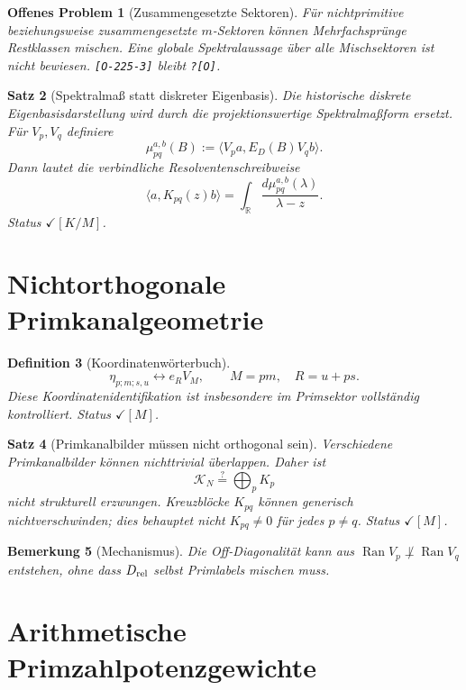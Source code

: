 \documentclass[11pt,a4paper]{amsart}
\newtheorem{theorem}{Satz}[section]
\newtheorem{definition}[theorem]{Definition}
\newtheorem{remark}[theorem]{Bemerkung}
\newtheorem{openproblem}[theorem]{Offenes Problem}
\newcommand{\stM}{\ensuremath{\checkmark[M]}}
\newcommand{\stKM}{\ensuremath{\checkmark[K/M]}}
\newcommand{\Open}{\texttt{?[O]}}
\begin{document}
\begin{openproblem}[Zusammengesetzte Sektoren]
Für nichtprimitive beziehungsweise zusammengesetzte $m$-Sektoren können
Mehrfachsprünge Restklassen mischen. Eine globale Spektralaussage über alle
Mischsektoren ist nicht bewiesen. \texttt{[O-225-3]} bleibt \Open.
\end{openproblem}

\begin{theorem}[Spektralmaß statt diskreter Eigenbasis]\label{thm:spectral-measure}
Die historische diskrete Eigenbasisdarstellung wird durch die
projektionswertige Spektralmaßform ersetzt. Für $V_p,V_q$ definiere
\[
\mu_{pq}^{a,b}(B):=\langle V_pa,E_D(B)V_qb\rangle.
\]
Dann lautet die verbindliche Resolventenschreibweise
\[
\langle a,K_{pq}(z)b\rangle
=\int_{\mathbb R}\frac{d\mu_{pq}^{a,b}(\lambda)}{\lambda-z}.
\]
Status \stKM.
\end{theorem}

\section{Nichtorthogonale Primkanalgeometrie}

\begin{definition}[Koordinatenwörterbuch]
\[
\eta_{p;m;s,u}\longleftrightarrow e_RV_M,
\qquad M=pm,\quad R=u+ps.
\]
Diese Koordinatenidentifikation ist insbesondere im Primsektor vollständig
kontrolliert. Status \stM.
\end{definition}

\begin{theorem}[Primkanalbilder müssen nicht orthogonal sein]
\label{thm:nonorthogonal}
Verschiedene Primkanalbilder können nichttrivial überlappen. Daher ist
\[
\mathcal K_N\stackrel{?}{=}\bigoplus_pK_p
\]
nicht strukturell erzwungen. Kreuzblöcke $K_{pq}$ können generisch
nichtverschwinden; dies behauptet nicht $K_{pq}\neq0$ für jedes $p\neq q$.
Status \stM.
\end{theorem}

\begin{remark}[Mechanismus]
Die Off-Diagonalität kann aus
$\operatorname{Ran}V_p\not\perp\operatorname{Ran}V_q$ entstehen, ohne dass
$D_{\rm rel}$ selbst Primlabels mischen muss.
\end{remark}

\section{Arithmetische Primzahlpotenzgewichte}
\end{document}
